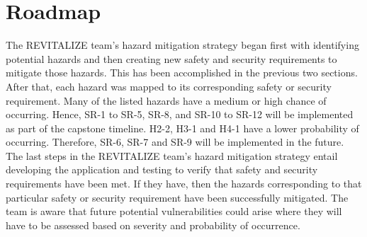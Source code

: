 \documentclass{article}
\begin{document}
\section{Roadmap}
The REVITALIZE team's hazard mitigation strategy began first with identifying potential hazards and then creating new safety and security requirements to mitigate those hazards. This has been accomplished in the previous two sections. After that, each hazard was mapped to its corresponding safety or security requirement. Many of the listed hazards have a medium or high chance of occurring. Hence, SR-1 to SR-5, SR-8, and SR-10 to SR-12 will be implemented as part of the capstone timeline. H2-2, H3-1 and H4-1 have a lower probability of occurring. Therefore, SR-6, SR-7 and SR-9 will be implemented in the future. The last steps in the REVITALIZE team's hazard mitigation strategy entail developing the application and testing to verify that safety and security requirements have been met. If they have, then the hazards corresponding to that particular safety or security requirement have been successfully mitigated. The team is aware that future potential vulnerabilities could arise where they will have to be assessed based on severity and probability of occurrence.
\end{document}
